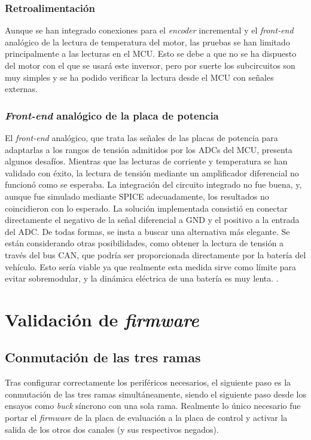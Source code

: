 \subsubsection{Retroalimentación}

Aunque se han integrado conexiones para el \textit{encoder} incremental y el \textit{front-end} analógico de la lectura de temperatura del motor, las pruebas se han limitado principalmente a las lecturas en el MCU. Esto se debe a que no se ha dispuesto del motor con el que se usará este inversor, pero por suerte los subcircuitos son muy simples y se ha podido verificar la lectura desde el MCU con señales externas.

\subsubsection{\textit{Front-end} analógico de la placa de potencia}

El \textit{front-end} analógico, que trata las señales de las placas de potencia para adaptarlas a los rangos de tensión admitidos por los ADCs del MCU, presenta algunos desafíos. Mientras que las lecturas de corriente y temperatura se han validado con éxito, la lectura de tensión mediante un amplificador diferencial no funcionó como se esperaba. La integración del circuito integrado no fue buena, y, aunque fue simulado mediante SPICE adecuadamente, los resultados no coincidieron con lo esperado. La solución implementada consistió en conectar directamente el negativo de la señal diferencial a GND y el positivo a la entrada del ADC. De todas formas, se insta a buscar una alternativa más elegante. Se están considerando otras posibilidades, como obtener la lectura de tensión a través del bus CAN, que podría ser proporcionada directamente por la batería del vehículo. Esto sería viable ya que realmente esta medida sirve como límite para evitar sobremodular, y la dinámica eléctrica de una batería es muy lenta.
.

\section{Validación de \textit{firmware}}

\subsection{Conmutación de las tres ramas}

Tras configurar correctamente los periféricos necesarios, el siguiente paso es la conmutación de las tres ramas simultáneamente, siendo el siguiente paso desde los ensayos como \textit{buck} síncrono con una sola rama. Realmente lo único necesario fue portar el \textit{firmware} de la placa de evaluación a la placa de control y activar la salida de los otros dos canales (y sus respectivos negados).

